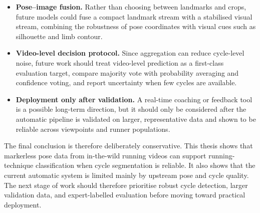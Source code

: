 \begin{itemize}
    \item \textbf{Pose--image fusion.} Rather than choosing between landmarks and
    crops, future models could fuse a compact landmark stream with a
    stabilised visual stream, combining the robustness of pose coordinates
    with visual cues such as silhouette and limb contour.
    
    \item \textbf{Video-level decision protocol.} Since aggregation can reduce
    cycle-level noise, future work should treat video-level prediction as a
    first-class evaluation target, compare majority vote with probability
    averaging and confidence voting, and report uncertainty when few cycles
    are available.
    
    \item \textbf{Deployment only after validation.} A real-time coaching or
    feedback tool is a possible long-term direction, but it should only be
    considered after the automatic pipeline is validated on larger,
    representative data and shown to be reliable across viewpoints and
    runner populations.
\end{itemize}

The final conclusion is therefore deliberately conservative. This thesis shows
that markerless pose data from in-the-wild running videos can support
running-technique classification when cycle segmentation is reliable. It also
shows that the current automatic system is limited mainly by upstream pose and
cycle quality. The next stage of work should therefore prioritise robust cycle
detection, larger validation data, and expert-labelled evaluation before moving
toward practical deployment.

